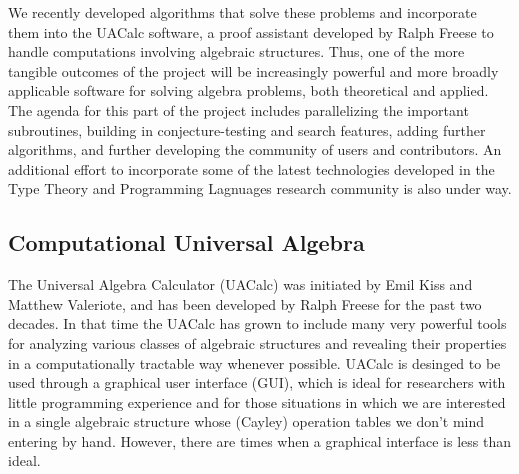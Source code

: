 \documentclass[12pt]{amsart}  %
\begin{document}
We recently developed algorithms that solve these problems and 
incorporate them into the UACalc software, a proof assistant developed
by Ralph Freese to handle computations involving algebraic structures. 
Thus, one of the more tangible outcomes of the project will be
increasingly powerful and more broadly applicable software for solving
algebra problems, both theoretical and applied.
The agenda for this part of the project includes parallelizing the important subroutines,
building in conjecture-testing and search features, adding further algorithms,
and further developing the community of users and contributors. An additional
effort to incorporate some of the latest technologies developed in the Type
Theory and Programming Lagnuages research community is also under way.



\subsection{Computational Universal Algebra}
The Universal Algebra Calculator (UACalc) was initiated by Emil Kiss and Matthew Valeriote,
and has been developed by Ralph Freese for the past two decades.  In that time 
the UACalc has grown to include many very powerful tools for analyzing various 
classes of algebraic structures and revealing their properties in a computationally 
tractable way whenever possible.  UACalc is desinged to be used through a  
graphical user interface (GUI), which is ideal for researchers with little programming experience 
and for those situations in which we are interested in a single algebraic structure 
whose (Cayley) operation tables we don't mind entering by hand. 
However, there are times when a graphical interface is less than ideal.
\end{document}
